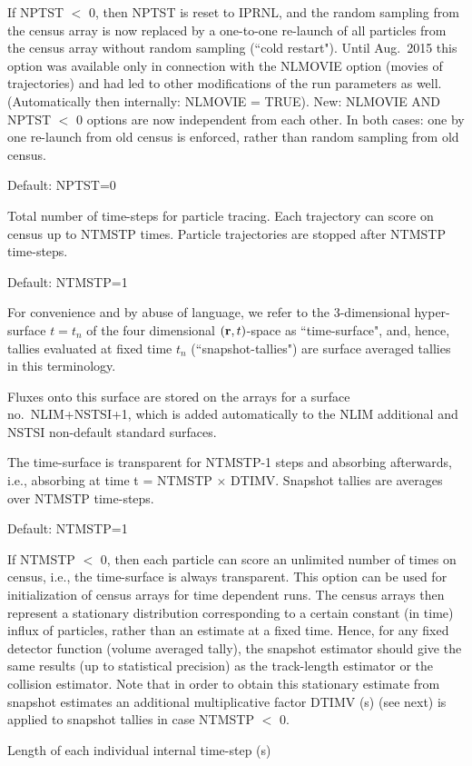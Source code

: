 \begin{description}
        If NPTST $<$ 0, then NPTST is reset to IPRNL, and the random sampling from the census array is now replaced by a one-to-one re-launch of all particles from the census array without random sampling (``cold restart").
        Until Aug.\ 2015 this option was available only in connection with the NLMOVIE option (movies of trajectories) and had led to other modifications of the run parameters as well.
        (Automatically then internally: NLMOVIE = TRUE).
        New: NLMOVIE AND NPTST $<$ 0 options are now independent from each other.
        In both cases: one by one re-launch from old census is enforced, rather than random sampling from old census.

        Default: NPTST=0
  \item[NTMSTP] Total number of time-steps for particle tracing.
        Each trajectory can score on census up to NTMSTP times.
        Particle trajectories are stopped after NTMSTP time-steps.

        Default: NTMSTP=1 

        For convenience and by abuse of language, we refer to the 3-dimensional hyper-surface $t=t_n$ of the four dimensional $(\mathbf{r},t)$-space as ``time-surface", and, hence, tallies evaluated at fixed time $t_n$ (``snapshot-tallies") are surface averaged tallies in this terminology.

        Fluxes onto this surface are stored on the arrays for a surface no.\ NLIM+NSTSI+1, which is added automatically to the NLIM additional and NSTSI non-default standard surfaces.

        The time-surface is transparent for NTMSTP-1 steps and absorbing afterwards, i.e., absorbing at time t = NTMSTP $\times$ DTIMV.
        Snapshot tallies are averages over NTMSTP time-steps.

        Default: NTMSTP=1 

        If NTMSTP $<$ 0, then each particle can score an unlimited number of times on census, i.e., the time-surface is always transparent.
        This option can be used for initialization of census arrays for time dependent runs.
        The census arrays then represent a stationary distribution corresponding to a certain constant (in time) influx of particles, rather than an estimate at a fixed time.
        Hence, for any fixed detector function (volume averaged tally), the snapshot estimator should give the same results (up to statistical precision) as the track-length estimator or the collision estimator.
        Note that in order to obtain this stationary estimate from snapshot estimates an additional multiplicative factor DTIMV (\si{\second}) (see next) is applied to snapshot tallies in case NTMSTP $<$ 0.
  \item[DTIMV] Length of each individual internal time-step (\si{\second}) 


\end{description}
